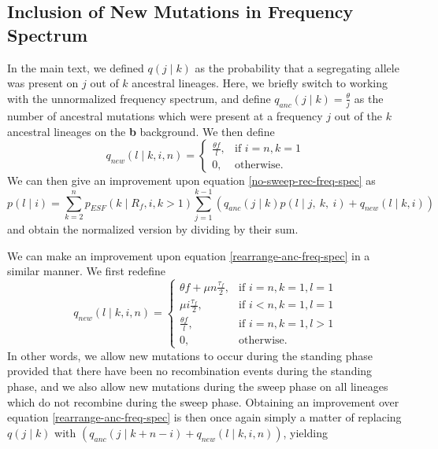 \documentclass[a4paper,10pt]{article}
\begin{document}
\subsection{Inclusion of New Mutations in Frequency Spectrum}
In the main text, we defined $q(j \mid k)$ as the probability that a segregating allele was present on $j$ out of $k$ ancestral lineages. Here, we briefly switch to working with the unnormalized frequency spectrum, and define $q_{anc}(j \mid k) = \frac{\theta}{j}$ as the number of ancestral mutations which were present at a frequency $j$ out of the $k$ ancestral lineages on the \textbf{b} background. We then define 
\begin{equation}
	q_{new}(l \mid k, i, n) =
	\begin{cases} 
		\frac{\theta f}{l}, 	& \text{if } i = n, k = 1 \\
		0, 				& \text{otherwise}.
	\end{cases}
\end{equation}
We can then give an improvement upon equation \eqref{no-sweep-rec-freq-spec} as
\begin{equation}
	p(l \mid i) =  \sum_{k=2}^{n}  p_{ESF}(k \mid R_f,i,k>1)  \sum_{j=1}^{k-1} \left(q_{anc}(j\mid k)p(l \mid j,~k, ~i)  + q_{new}(l \mid k,i) \right)
\end{equation}
and obtain the normalized version by dividing by their sum.

We can make an improvement upon equation \eqref{rearrange-anc-freq-spec} in a similar manner. We first redefine
\begin{equation}
	q_{new}(l \mid k, i, n) =
	\begin{cases} 
		\theta f + \mu n\frac{\tau_f}{2}, 	& \text{if } i = n, k = 1, l=1 \\
		\mu i\frac{\tau_f}{2},			& \text{if } i < n, k = 1, l =1 \\
		\frac{\theta f}{l},		& \text{if } i = n, k = 1, l > 1\\
		0, 				& \text{otherwise}.
	\end{cases}
\end{equation}
In other words, we allow new mutations to occur during the standing phase provided that there have been no recombination events during the standing phase, and we also allow new mutations during the sweep phase on all lineages which do not recombine during the sweep phase. Obtaining an improvement over equation \eqref{rearrange-anc-freq-spec} is then once again simply a matter of replacing $q(j \mid k)$ with $\left(q_{anc}(j\mid k+n-i) + q_{new}(l \mid k,i,n)\right)$, yielding
\end{document}
